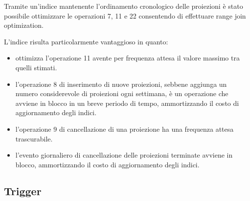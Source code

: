 Tramite un'indice mantenente l'ordinamento cronologico delle proiezioni è stato
possibile ottimizzare le operazioni 7, 11 e 22 consentendo di effettuare
range join optimization.

L'indice risulta particolarmente vantaggioso in quanto:
\begin{itemize}
    \item ottimizza l'operazione 11 avente per frequenza attesa il valore
          massimo tra quelli stimati.
    \item l'operazione 8 di inserimento di nuove proiezioni,
          sebbene aggiunga un numero considerevole di proiezioni ogni settimana,
          è un operazione che avviene in blocco in un breve periodo di tempo,
          ammortizzando il costo di aggiornamento degli indici.
    \item l'operazione 9 di cancellazione di una proiezione ha una frequenza
          attesa trascurabile.
    \item l'evento giornaliero di cancellazione delle proiezioni terminate
          avviene in blocco, ammortizzando il costo di aggiornamento degli indici.
\end{itemize}

\pagebreak

\subsection*{Trigger}
%
%

